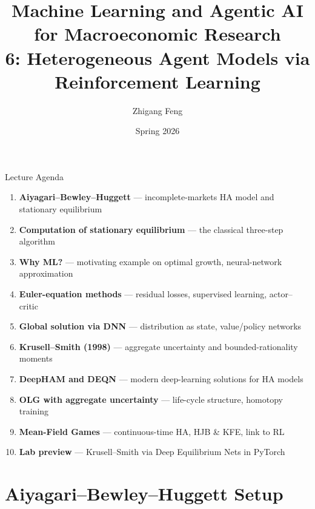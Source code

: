 \documentclass[10pt,english,aspectratio=169]{beamer}
\title[ML \& Agentic AI for Macro Research]{Machine Learning and Agentic AI for Macroeconomic Research\\
6: Heterogeneous Agent Models via Reinforcement Learning\\[0.5em]}
\author{Zhigang Feng}
\date{Spring 2026}
\newcommand\makebeamertitle{\frame{\maketitle}}%
\begin{document}
\makebeamertitle


\begin{frame}{Lecture Agenda}
\begin{enumerate}
  \item \textbf{Aiyagari--Bewley--Huggett} --- incomplete-markets HA model and stationary equilibrium
  \medskip
  \item \textbf{Computation of stationary equilibrium} --- the classical three-step algorithm
  \medskip
  \item \textbf{Why ML?} --- motivating example on optimal growth, neural-network approximation
  \medskip
  \item \textbf{Euler-equation methods} --- residual losses, supervised learning, actor--critic
  \medskip
  \item \textbf{Global solution via DNN} --- distribution as state, value/policy networks
  \medskip
  \item \textbf{Krusell--Smith (1998)} --- aggregate uncertainty and bounded-rationality moments
  \medskip
  \item \textbf{DeepHAM and DEQN} --- modern deep-learning solutions for HA models
  \medskip
  \item \textbf{OLG with aggregate uncertainty} --- life-cycle structure, homotopy training
  \medskip
  \item \textbf{Mean-Field Games} --- continuous-time HA, HJB \& KFE, link to RL
  \medskip
  \item \textbf{Lab preview} --- Krusell--Smith via Deep Equilibrium Nets in PyTorch
\end{enumerate}
\end{frame}


\section{Aiyagari--Bewley--Huggett Setup}
\end{document}
